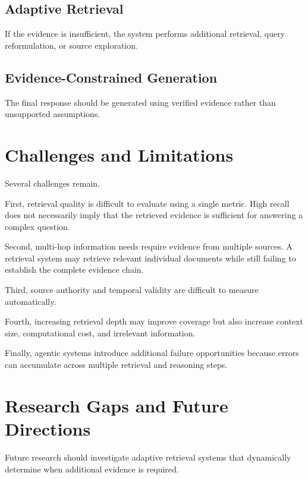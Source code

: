 \documentclass[12pt,a4paper]{article}
\begin{document}
\subsection{Adaptive Retrieval}

If the evidence is insufficient, the system performs additional retrieval,
query reformulation, or source exploration.

\subsection{Evidence-Constrained Generation}

The final response should be generated using verified evidence rather than
unsupported assumptions.

\section{Challenges and Limitations}
\label{sec:challenges}

Several challenges remain.

First, retrieval quality is difficult to evaluate using a single metric.
High recall does not necessarily imply that the retrieved evidence is
sufficient for answering a complex question.

Second, multi-hop information needs require evidence from multiple sources.
A retrieval system may retrieve relevant individual documents while still
failing to establish the complete evidence chain.

Third, source authority and temporal validity are difficult to measure
automatically.

Fourth, increasing retrieval depth may improve coverage but also increase
context size, computational cost, and irrelevant information.

Finally, agentic systems introduce additional failure opportunities because
errors can accumulate across multiple retrieval and reasoning steps.

\section{Research Gaps and Future Directions}
\label{sec:future-directions}

Future research should investigate adaptive retrieval systems that
dynamically determine when additional evidence is required.
\end{document}
